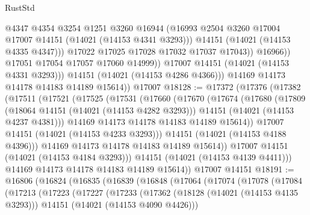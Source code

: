 \begin{lexlean}{RustStd}
\begin{coremodule}
{\begin{coremodule}
{{{{{{{{{{{{{{{{{{{{{{{{{{{{{{{{{{{{{{{                          @4347
                          @4354
                          @3254
                          @1251
                          @3260
                          @16944
                          (@16993 @2504 @3260 @17004 @17007 @14151 (@14021 (@14153 @4341 @3293)))
                          @14151
                          (@14021 (@14153 @4335 @4347)))
                        @17022
                        @17025
                        @17028
                        @17032
                        @17037
                        @17043))
                    @16966))
                @17051
                @17054
                @17057
                @17060
                @14999))
            @17007
            @14151
            (@14021 (@14153 @4331 @3293)))
          @14151
          (@14021 (@14153 @4286 @4366)))
        @14169
        @14173
        @14178
        @14183
        @14189
        @15614))
    @17007
@18128 := @17372
    (@17376
      (@17382
        (@17511
          (@17521
            (@17525
              (@17531
                (@17660
                  (@17670
                    (@17674
                      (@17680
                        (@17809
                          (@18064 @14151 (@14021 (@14153 @4282 @3293)))
                          @14151
                          (@14021 (@14153 @4237 @4381)))
                        @14169
                        @14173
                        @14178
                        @14183
                        @14189
                        @15614))
                    @17007
                    @14151
                    (@14021 (@14153 @4233 @3293)))
                  @14151
                  (@14021 (@14153 @4188 @4396)))
                @14169
                @14173
                @14178
                @14183
                @14189
                @15614))
            @17007
            @14151
            (@14021 (@14153 @4184 @3293)))
          @14151
          (@14021 (@14153 @4139 @4411)))
        @14169
        @14173
        @14178
        @14183
        @14189
        @15614))
    @17007
    @14151
@18191 := @16806
    (@16824
      (@16835
        (@16839
          (@16848
            (@17064
              (@17074
                (@17078
                  (@17084
                    (@17213
                      (@17223
                        (@17227
                          (@17233
                            (@17362
                              (@18128 (@14021 (@14153 @4135 @3293)))
                              @14151
                              (@14021 (@14153 @4090 @4426)))
}}}}}}}}}}}}}}}}}}}}}}}}}}}}}}}}}}}}}}}
\end{coremodule}}
\end{coremodule}
\end{lexlean}
